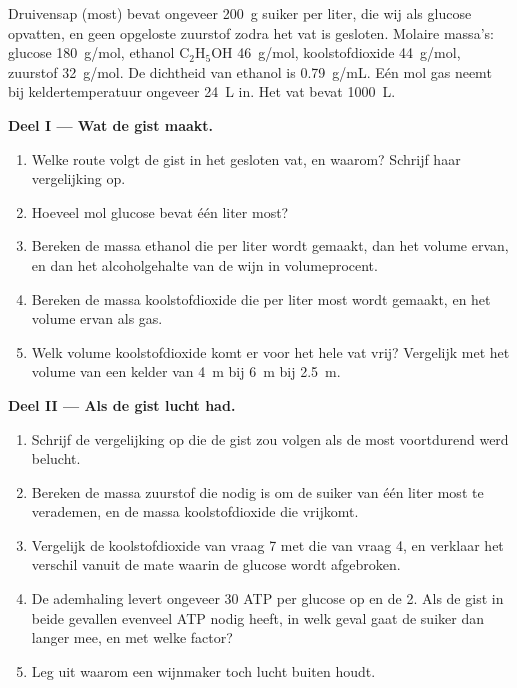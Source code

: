 \begin{problem}
\label{pb:g10:cell-metabolism:1}
Druivensap (most) bevat ongeveer \qty{200}{g} suiker per liter, die wij
als glucose opvatten, en geen opgeloste zuurstof zodra het vat is
gesloten. Molaire massa's: glucose \qty{180}{g/mol}, ethanol
$\mathrm{C_2H_5OH}$ \qty{46}{g/mol}, koolstofdioxide \qty{44}{g/mol},
zuurstof \qty{32}{g/mol}. De dichtheid van ethanol is \qty{0.79}{g/mL}.
Eén mol gas neemt bij keldertemperatuur ongeveer \qty{24}{L} in. Het vat
bevat \qty{1000}{L}.

\medskip
\noindent\textbf{Deel I --- Wat de gist maakt.}
\begin{enumerate}
  \item Welke route volgt de gist in het gesloten vat, en waarom?
        Schrijf haar vergelijking op.
  \item Hoeveel mol glucose bevat één liter most?
  \item Bereken de massa ethanol die per liter wordt gemaakt, dan het
        volume ervan, en dan het alcoholgehalte van de wijn in
        volumeprocent.
  \item Bereken de massa koolstofdioxide die per liter most wordt
        gemaakt, en het volume ervan als gas.
  \item Welk volume koolstofdioxide komt er voor het hele vat vrij?
        Vergelijk met het volume van een kelder van \qty{4}{m} bij
        \qty{6}{m} bij \qty{2.5}{m}.
\end{enumerate}

\medskip
\noindent\textbf{Deel II --- Als de gist lucht had.}
\begin{enumerate}[resume]
  \item Schrijf de vergelijking op die de gist zou volgen als de most
        voortdurend werd belucht.
  \item Bereken de massa zuurstof die nodig is om de suiker van één
        liter most te verademen, en de massa koolstofdioxide die
        vrijkomt.
  \item Vergelijk de koolstofdioxide van vraag 7 met die van vraag 4, en
        verklaar het verschil vanuit de mate waarin de glucose wordt
        afgebroken.
  \item De ademhaling levert ongeveer 30 ATP per glucose op en de
         2. Als de gist in beide gevallen evenveel ATP nodig
        heeft, in welk geval gaat de suiker dan langer mee, en met welke
        factor?
  \item Leg uit waarom een wijnmaker toch lucht buiten houdt.
\end{enumerate}


\end{problem}
